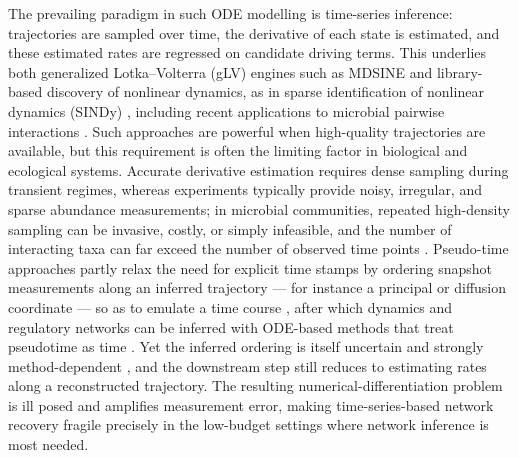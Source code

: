 The prevailing paradigm in such ODE modelling is time-series inference: trajectories
are sampled over time, the derivative of each state is estimated, and these estimated
rates are regressed on candidate driving terms. This underlies both generalized
Lotka--Volterra (gLV) engines such as MDSINE \citep{bucci2016mdsine} and library-based
discovery of nonlinear dynamics, as in
sparse identification of nonlinear dynamics (SINDy)
\citep{brunton2016sindy,kaptanoglu2022pysindy}, including recent applications to
microbial pairwise interactions \citep{sindy2023microbiota}. Such approaches are
powerful when high-quality trajectories are available, but this requirement is often
the limiting factor in biological and ecological systems. Accurate derivative
estimation requires dense sampling during transient regimes, whereas experiments
typically provide noisy, irregular, and sparse abundance measurements; in microbial
communities, repeated high-density sampling can be invasive, costly, or simply
infeasible, and the number of interacting taxa can far exceed the number of observed
time points \citep{stein2013ecological,bucci2016mdsine}. Pseudo-time approaches partly
relax the need for explicit time stamps by ordering snapshot measurements along an
inferred trajectory --- for instance a principal or diffusion coordinate --- so as to
emulate a time course \citep{trapnell2014pseudotime,haghverdi2016diffusion}, after which
dynamics and regulatory networks can be inferred with ODE-based methods that treat
pseudotime as time \citep{matsumoto2017scode}. Yet the inferred ordering is itself
uncertain and strongly method-dependent \citep{saelens2019comparison}, and the
downstream step still reduces to estimating rates along a reconstructed trajectory. The
resulting numerical-differentiation problem is ill posed and amplifies measurement
error, making time-series-based network recovery fragile precisely in the low-budget
settings where network inference is most needed.

